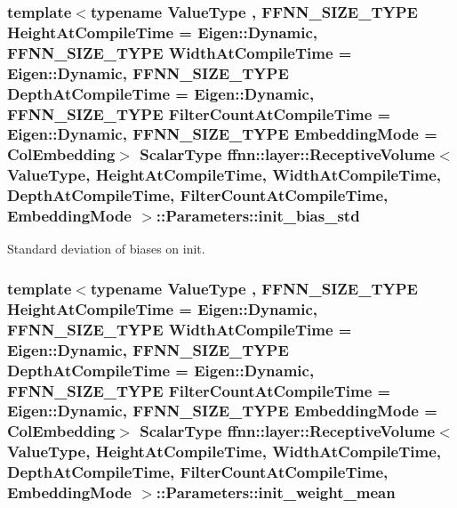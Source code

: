 \hypertarget{structffnn_1_1layer_1_1_receptive_volume_1_1_parameters_a984f46ddb8084fdca29fd6c937d434b4}{
\subsubsection[{init\-\_\-bias\-\_\-std}]{\setlength{\rightskip}{0pt plus 5cm}template$<$typename Value\-Type , F\-F\-N\-N\-\_\-\-S\-I\-Z\-E\-\_\-\-T\-Y\-P\-E Height\-At\-Compile\-Time = Eigen\-::\-Dynamic, F\-F\-N\-N\-\_\-\-S\-I\-Z\-E\-\_\-\-T\-Y\-P\-E Width\-At\-Compile\-Time = Eigen\-::\-Dynamic, F\-F\-N\-N\-\_\-\-S\-I\-Z\-E\-\_\-\-T\-Y\-P\-E Depth\-At\-Compile\-Time = Eigen\-::\-Dynamic, F\-F\-N\-N\-\_\-\-S\-I\-Z\-E\-\_\-\-T\-Y\-P\-E Filter\-Count\-At\-Compile\-Time = Eigen\-::\-Dynamic, F\-F\-N\-N\-\_\-\-S\-I\-Z\-E\-\_\-\-T\-Y\-P\-E Embedding\-Mode = Col\-Embedding$>$ {\bf Scalar\-Type} {\bf ffnn\-::layer\-::\-Receptive\-Volume}$<$ Value\-Type, Height\-At\-Compile\-Time, Width\-At\-Compile\-Time, Depth\-At\-Compile\-Time, Filter\-Count\-At\-Compile\-Time, {\bf Embedding\-Mode} $>$\-::Parameters\-::init\-\_\-bias\-\_\-std}}\label{structffnn_1_1layer_1_1_receptive_volume_1_1_parameters_a984f46ddb8084fdca29fd6c937d434b4}


Standard deviation of biases on init. 

\hypertarget{structffnn_1_1layer_1_1_receptive_volume_1_1_parameters_a1ea54ba10c894ea34103dda948539fba}{
\subsubsection[{init\-\_\-weight\-\_\-mean}]{\setlength{\rightskip}{0pt plus 5cm}template$<$typename Value\-Type , F\-F\-N\-N\-\_\-\-S\-I\-Z\-E\-\_\-\-T\-Y\-P\-E Height\-At\-Compile\-Time = Eigen\-::\-Dynamic, F\-F\-N\-N\-\_\-\-S\-I\-Z\-E\-\_\-\-T\-Y\-P\-E Width\-At\-Compile\-Time = Eigen\-::\-Dynamic, F\-F\-N\-N\-\_\-\-S\-I\-Z\-E\-\_\-\-T\-Y\-P\-E Depth\-At\-Compile\-Time = Eigen\-::\-Dynamic, F\-F\-N\-N\-\_\-\-S\-I\-Z\-E\-\_\-\-T\-Y\-P\-E Filter\-Count\-At\-Compile\-Time = Eigen\-::\-Dynamic, F\-F\-N\-N\-\_\-\-S\-I\-Z\-E\-\_\-\-T\-Y\-P\-E Embedding\-Mode = Col\-Embedding$>$ {\bf Scalar\-Type} {\bf ffnn\-::layer\-::\-Receptive\-Volume}$<$ Value\-Type, Height\-At\-Compile\-Time, Width\-At\-Compile\-Time, Depth\-At\-Compile\-Time, Filter\-Count\-At\-Compile\-Time, {\bf Embedding\-Mode} $>$\-::Parameters\-::init\-\_\-weight\-\_\-mean}}\label{structffnn_1_1layer_1_1_receptive_volume_1_1_parameters_a1ea54ba10c894ea34103dda948539fba}


